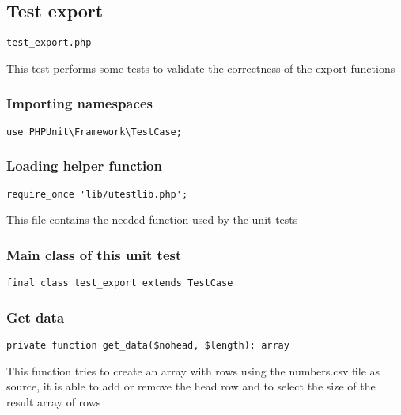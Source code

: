 \documentclass[a4paper]{article}
\begin{document}
\hypertarget{toc170}{}
\subsection{Test export}

\begin{lstlisting}
test_export.php
\end{lstlisting}

This test performs some tests to validate the correctness
of the export functions

\hypertarget{toc171}{}
\subsubsection{Importing namespaces}

\begin{lstlisting}
use PHPUnit\Framework\TestCase;
\end{lstlisting}

\hypertarget{toc172}{}
\subsubsection{Loading helper function}

\begin{lstlisting}
require_once 'lib/utestlib.php';
\end{lstlisting}

This file contains the needed function used by the unit tests

\hypertarget{toc173}{}
\subsubsection{Main class of this unit test}

\begin{lstlisting}
final class test_export extends TestCase
\end{lstlisting}

\hypertarget{toc174}{}
\subsubsection{Get data}

\begin{lstlisting}
private function get_data($nohead, $length): array
\end{lstlisting}

This function tries to create an array with rows using the numbers.csv file
as source, it is able to add or remove the head row and to select the size
of the result array of rows
\end{document}
